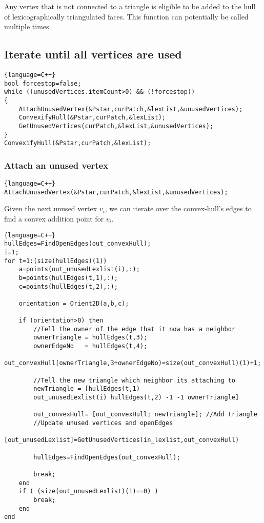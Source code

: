 \documentclass[11pt,letterpaper,titlepage]{article}
\begin{document}
\noindent Any vertex that is not connected to a triangle is eligible to be added to the hull of lexicographically triangulated faces. This function can potentially be called multiple times.

\subsection{Iterate until all vertices are used}

\begin{lstlisting}{language=C++}
bool forcestop=false;
while ((unusedVertices.itemCount>0) && (!forcestop))
{
	AttachUnusedVertex(&Pstar,curPatch,&lexList,&unusedVertices);
	ConvexifyHull(&Pstar,curPatch,&lexList);
	GetUnusedVertices(curPatch,&lexList,&unusedVertices);
}
ConvexifyHull(&Pstar,curPatch,&lexList);
\end{lstlisting}

\newpage
\subsubsection{Attach an unused vertex}

\begin{lstlisting}{language=C++}
AttachUnusedVertex(&Pstar,curPatch,&lexList,&unusedVertices);
\end{lstlisting}
Given the next unused vertex $v_i$, we can iterate over the convex-hull's edges to find a convex addition point for $v_i$.

\begin{lstlisting}{language=C++}
hullEdges=FindOpenEdges(out_convexHull);
i=1;
for t=1:(size(hullEdges)(1))
    a=points(out_unusedLexlist(i),:);
    b=points(hullEdges(t,1),:);
    c=points(hullEdges(t,2),:);
    
    orientation = Orient2D(a,b,c);
    
    if (orientation>0) then
        //Tell the owner of the edge that it now has a neighbor
        ownerTriangle = hullEdges(t,3);
        ownerEdgeNo   = hullEdges(t,4);
        out_convexHull(ownerTriangle,3+ownerEdgeNo)=size(out_convexHull)(1)+1;
        
        //Tell the new triangle which neighbor its attaching to
        newTriangle = [hullEdges(t,1) 
        out_unusedLexlist(i) hullEdges(t,2) -1 -1 ownerTriangle]
        
        out_convexHull= [out_convexHull; newTriangle]; //Add triangle
        //Update unused vertices and openEdges
        [out_unusedLexlist]=GetUnusedVertices(in_lexlist,out_convexHull)
        
        hullEdges=FindOpenEdges(out_convexHull);
     
        break;
    end                       
    if ( (size(out_unusedLexlist)(1)==0) )
        break;
    end
end
\end{lstlisting}
\end{document}
